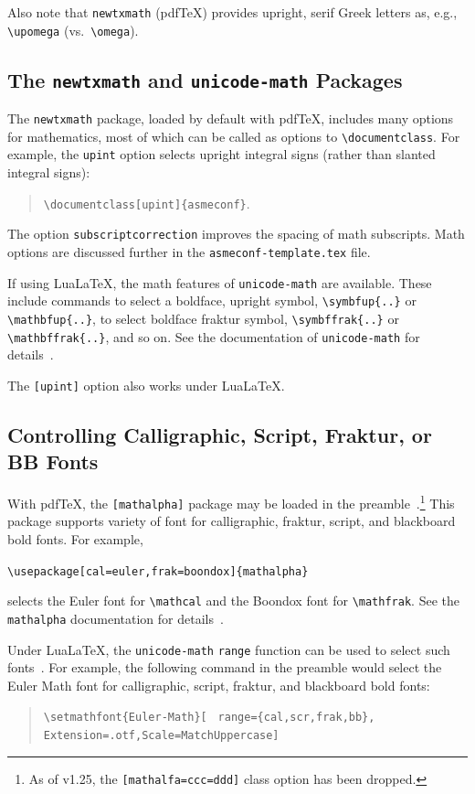 \documentclass[balance,nocopyright,upint,varvw,hyphenate,barcolor=Goldenrod3,german]{asmejour}%
\newcommand*\pdfTeX{pdf\TeX}
\newcommand*\LuaLaTeX{Lua\LaTeX}
\begin{document}
Also note that \texttt{newtxmath} (\pdfTeX) provides upright, serif Greek letters as, e.g., \verb|\upomega| (vs.\ \verb|\omega|).

\subsection{The \texttt{newtxmath} and \texttt{unicode-math} Packages~\cite{sharpe1,robertson2023}} The \texttt{newtxmath} package, loaded by default with \pdfTeX, includes many options for mathematics, most of which can be called as options to \verb|\documentclass|. For example, the \texttt{upint} option selects upright integral signs (rather than slanted integral signs):
\begin{quote}
\verb|\documentclass[upint]{asmeconf}|. 
\end{quote}  
The option \verb|subscriptcorrection| improves the spacing of math subscripts. Math options are discussed further in the \texttt{asmeconf-template.tex} file. 

If using \LuaLaTeX, the math features of \texttt{unicode-math} are available.  These include commands to select a boldface, upright symbol, \verb|\symbfup{..}| or \verb|\mathbfup{..}|, to select boldface fraktur symbol, \verb|\symbffrak{..}| or \verb|\mathbffrak{..}|, and so on.  See the documentation of \texttt{unicode-math} for details~\cite{robertson2023}.

The \texttt{[upint]} option also works under \LuaLaTeX.


\subsection{Controlling Calligraphic, Script, Fraktur, or BB Fonts}
With \pdfTeX, the \texttt{[mathalpha]} package may be loaded in the preamble~\cite{sharpe2}.\footnote{As of v1.25, the \texttt{[mathalfa=ccc=ddd]} class option has been dropped.} This package supports variety of font for calligraphic, fraktur, script, and blackboard bold fonts. For example,
\begin{center}
\verb|\usepackage[cal=euler,frak=boondox]{mathalpha}| 
\end{center}
selects the Euler font for \verb|\mathcal| and the Boondox font for \verb|\mathfrak|. See the \texttt{mathalpha} documentation for details~\cite{sharpe2}.

Under \LuaLaTeX, the \texttt{unicode-math} \texttt{range} function can be used to select such fonts~\cite{robertson2023}. For example, the following command in the preamble would select the Euler Math font for calligraphic, script, fraktur, and blackboard bold fonts:
\begin{quote}\raggedright
\verb|\setmathfont{Euler-Math}[|
\verb| range={cal,scr,frak,bb},|
\verb| Extension=.otf,Scale=MatchUppercase]|
\end{quote}
\end{document}
